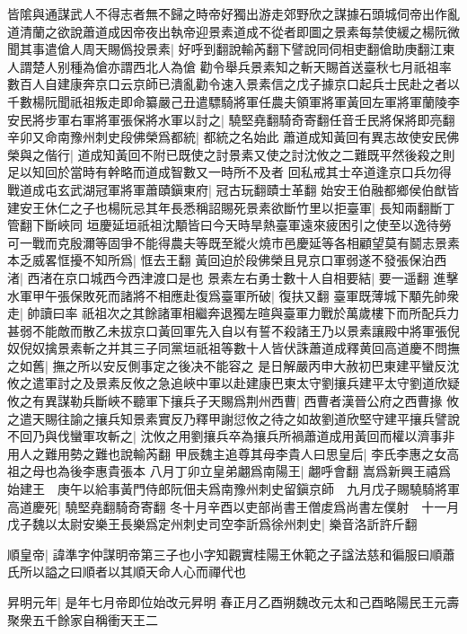 皆隂與通謀武人不得志者無不歸之時帝好獨出游走郊野欣之謀據石頭城伺帝出作亂道清蘭之欲說蕭道成因帝夜出執帝迎景素道成不從者即圖之景素每禁使緩之楊阮微聞其事遣傖人周天賜僞投景素|{
	好呼到翻說輸芮翻下譬說同伺相吏翻傖助庚翻江東人謂楚人别種為傖亦謂西北人為傖}
勸令舉兵景素知之斬天賜首送臺秋七月祇祖率數百人自建康奔京口云京師已潰亂勸令速入景素信之戊子據京口起兵士民赴之者以千數楊阮聞祇祖叛走即命纂嚴己丑遣驃騎將軍任農夫領軍將軍黃回左軍將軍蘭陵李安民將步軍右軍將軍張保將水軍以討之|{
	驍堅堯翻騎奇寄翻任音壬民將保將即亮翻}
辛卯又命南豫州刺史段佛榮爲都統|{
	都統之名始此}
蕭道成知黃回有異志故使安民佛榮與之偕行|{
	道成知黃回不附已既使之討景素又使之討沈攸之二難既平然後殺之則足以知回於當時有幹略而道成智數又一時所不及者}
回私戒其士卒道逢京口兵勿得戰道成屯玄武湖冠軍將軍蕭賾鎭東府|{
	冠古玩翻賾士革翻}
始安王伯融都鄉侯伯猷皆建安王休仁之子也楊阮忌其年長悉稱詔賜死景素欲斷竹里以拒臺軍|{
	長知兩翻斷丁管翻下斷峽同}
垣慶延垣祇祖沈顒皆曰今天時旱熱臺軍遠來疲困引之使至以逸待勞可一戰而克殷濔等固爭不能得農夫等既至縱火燒市邑慶延等各相顧望莫有鬬志景素本乏威畧恇擾不知所爲|{
	恇去王翻}
黃回迫於段佛榮且見京口軍弱遂不發張保泊西渚|{
	西渚在京口城西今西津渡口是也}
景素左右勇士數十人自相要結|{
	要一遥翻}
進擊水軍甲午張保敗死而諸將不相應赴復爲臺軍所破|{
	復扶又翻}
臺軍既薄城下顒先帥衆走|{
	帥讀曰率}
祇祖次之其餘諸軍相繼奔退獨左暄與臺軍力戰於萬歲樓下而所配兵力甚弱不能敵而散乙未拔京口黃回軍先入自以有誓不殺諸王乃以景素讓殿中將軍張倪奴倪奴擒景素斬之并其三子同黨垣祇祖等數十人皆伏誅蕭道成釋黄回高道慶不問撫之如舊|{
	撫之所以安反側事定之後决不能容之}
是日解嚴丙申大赦初巴東建平蠻反沈攸之遣軍討之及景素反攸之急追峽中軍以赴建康巴東太守劉攘兵建平太守劉道欣疑攸之有異謀勒兵斷峽不聽軍下攘兵子天賜爲荆州西曹|{
	西曹者漢晉公府之西曹掾}
攸之遣天賜往諭之攘兵知景素實反乃釋甲謝愆攸之待之如故劉道欣堅守建平攘兵譬說不回乃與伐蠻軍攻斬之|{
	沈攸之用劉攘兵卒為攘兵所禍蕭道成用黃回而權以濟事非用人之難用勢之難也說輸芮翻}
甲辰魏主追尊其母李貴人曰思皇后|{
	李氏李惠之女高祖之母也為後李惠貴張本}
八月丁卯立皇弟翽爲南陽王|{
	翽呼會翻}
嵩爲新興王禧爲始建王　庚午以給事黃門侍郎阮佃夫爲南豫州刺史留鎭京師　九月戊子賜驍騎將軍高道慶死|{
	驍堅堯翻騎奇寄翻}
冬十月辛酉以吏部尚書王僧䖍爲尚書左僕射　十一月戊子魏以太尉安樂王長樂爲定州刺史司空李訢爲徐州刺史|{
	樂音洛訢許斤翻}


順皇帝|{
	諱準字仲謀明帝第三子也小字知觀實桂陽王休範之子諡法慈和徧服曰順蕭氏所以謚之曰順者以其順天命人心而禪代也}


昇明元年|{
	是年七月帝即位始改元昇明}
春正月乙酉朔魏改元太和己酉略陽民王元壽聚衆五千餘家自稱衝天王二

